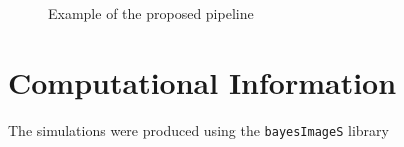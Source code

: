 \documentclass[journal]{IEEEtran}
\begin{document}
\begin{figure}[hbt]
\centering
{}
\caption{Example of the proposed pipeline}\label{fig:Pipeline}
\end{figure}

\appendix

\section{Computational Information}

The simulations were produced using the \verb|bayesImageS| library



\end{document}
